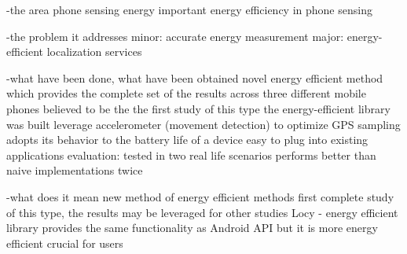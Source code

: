 -the area
	phone sensing
	energy important
	energy efficiency in  phone sensing

-the problem it addresses
	minor: accurate energy measurement
	major: energy-efficient localization services
	

-what have been done, what have been obtained
	novel energy efficient method 
	 	which provides the complete set of the results across three different mobile phones
	 	believed to be the the first study of this type
	the energy-efficient library was built
		leverage accelerometer (movement detection) to optimize GPS sampling
		adopts its behavior to the battery life of a device
		easy to plug into existing applications
		evaluation:
			tested in two real life scenarios
			performs better than naive implementations twice

-what does it mean
	new method of energy efficient methods
	first complete study of this type, the results may be leveraged for other studies
	Locy - energy efficient library 
		provides the same functionality as Android API
		but it is more energy efficient
		crucial for users
	
	